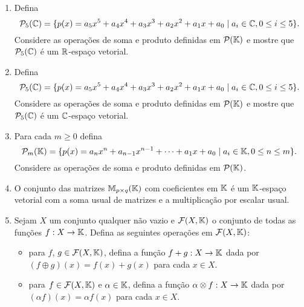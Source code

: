 \documentclass[12pt]{exam}
\begin{document}
\begin{exercicio}
\begin{enumerate}[label={\alph*})]
    \item Defina
    \[
      \mathcal{P}_5(\mathbb{C}) = \{ p(x) = a_5x^5 + a_4x^4 + a_3x^3 + a_2x^2 + a_1x + a_0 \mid a_i \in \mathbb{C}, 0 \le i \le 5 \}.
    \]
    Considere as opera\c{c}\~oes de soma e produto definidas em $\mathcal{P}(\mathbb{K})$ e mostre que $\mathcal{P}_5(\mathbb{C})$ \'e um $\mathbb{R}$-espa\c{c}o vetorial.

    \item Defina
    \[
      \mathcal{P}_5(\mathbb{C}) = \{ p(x) = a_5x^5 + a_4x^4 + a_3x^3 + a_2x^2 + a_1x + a_0 \mid a_i \in \mathbb{C}, 0 \le i \le 5 \}.
    \]
    Considere as opera\c{c}\~oes de soma e produto definidas em $\mathcal{P}(\mathbb{K})$ e mostre que $\mathcal{P}_5(\mathbb{C})$ \'e um $\mathbb{C}$-espa\c{c}o vetorial.

    \item Para cada $m \ge 0$ defina
    \[
      \mathcal{P}_m(\mathbb{K}) = \{ p(x) = a_nx^n + a_{n - 1}x^{n - 1} + \cdots + a_1x + a_0 \mid a_i \in \mathbb{K}, 0 \le n \le m \}.
    \]
    Considere as opera\c{c}\~oes de soma e produto definidas em $\mathcal{P}(\mathbb{K})$.

    \item O conjunto das matrizes $\mathbb{M}_{p \times q}(\mathbb{K})$ com coeficientes em $\mathbb{K}$ \'e um $\mathbb{K}$-espa\c{c}o vetorial com a soma usual de matrizes e a multiplica\c{c}\~ao por escalar usual.

    \item Sejam $X$ um conjunto qualquer n\~ao vazio e $\mathcal{F}(X, \mathbb{K})$ o conjunto de todas as fun\c{c}\~oes $f : X \to \mathbb{K}$. Defina as seguintes opera\c{c}\~oes em $\mathcal{F}(X, \mathbb{K})$:
    \begin{itemize}
      \item  para $f$, $g \in \mathcal{F}(X, \mathbb{K})$, defina a fun\c{c}\~ao $f + g : X \to \mathbb{K}$ dada por $(f\oplus g)(x) = f(x) + g(x)$ para cada $x \in X$.
      \item para $f \in \mathcal{F}(X, \mathbb{K})$ e $\alpha \in \mathbb{K}$, defina a fun\c{c}\~ao $\alpha \otimes f: X \to \mathbb{K}$ dada por $(\alpha f)(x) = \alpha f(x)$ para cada $x \in X$.
    \end{itemize}
  \end{enumerate}
\end{exercicio}
\end{document}
